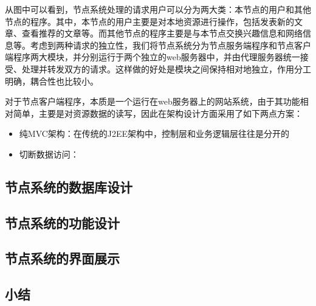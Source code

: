 从图中可以看到，节点系统处理的请求用户可以分为两大类：本节点的用户和其他节点的程序。其中，本节点的用户主要是对本地资源进行操作，包括发表新的文章、查看推荐的文章等。而其他节点的程序主要是与本节点交换兴趣信息和网络信息等。考虑到两种请求的独立性，我们将节点系统分为节点服务端程序和节点客户端程序两大模块，并分别运行于两个独立的web服务器中，并由代理服务器统一接受、处理并转发双方的请求。这样做的好处是模块之间保持相对地独立，作用分工明确，耦合性也比较小。

对于节点客户端程序，本质是一个运行在web服务器上的网站系统，由于其功能相对简单，主要是对资源数据的读写，因此在架构设计方面采用了如下两点方案：
\begin{itemize}
  \item 纯MVC架构：在传统的J2EE架构中，控制层和业务逻辑层往往是分开的
  \item 切断数据访问：
\end{itemize}

\subsection{节点系统的数据库设计}

\subsection{节点系统的功能设计}

\subsection{节点系统的界面展示}

\subsection{小结}
